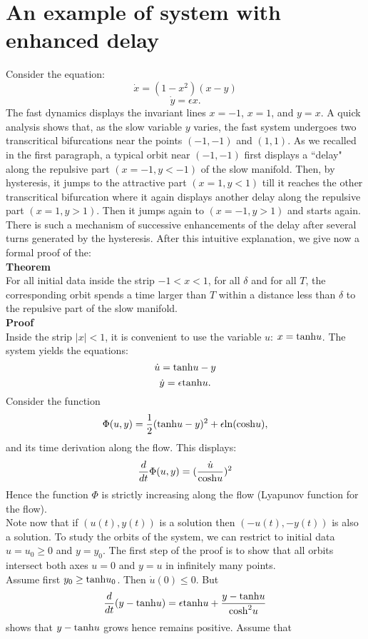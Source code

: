 \documentclass[12pt,psamsfonts]{amsart}
\begin{document}
\section{An example of system with enhanced delay}
Consider the equation:
$$\dot{x}=(1-x^2)(x-y)$$
$$\dot{y}={\epsilon}x.$$
The fast dynamics displays the invariant lines $x=-1$, $x=1$, and
$y=x$. A quick analysis shows that, as the slow variable $y$
varies, the fast system undergoes two transcritical bifurcations
near the points $(-1,-1)$ and $(1,1)$. As we recalled in the first
paragraph, a typical orbit near $(-1,-1)$ first displays a ``delay"
along the repulsive part $(x=-1,y<-1)$ of the slow manifold. Then,
by hysteresis, it jumps to the attractive part $(x=1,y<1)$ till it
reaches the other transcritical bifurcation where it again
displays another delay along the repulsive part $(x=1,y>1)$. Then
it jumps again to $(x=-1, y>1)$ and starts again. There is such a
mechanism of successive enhancements of the delay after several
turns generated by the hysteresis. After this intuitive
explanation, we give now a formal proof of the:\\
{\bf Theorem}\\
For all initial data inside the strip $-1<x<1$, for all $\delta$
and for all $T$, the corresponding orbit spends a time larger than
$T$ within a distance less than $\delta$ to the repulsive part of
the slow manifold.\\
{\bf Proof}\\
Inside the strip $\mid x\mid<1$, it is convenient to use the
variable $u$: $x={\rm tanh}u$. The system yields the equations:
$$\dot{u}={\rm tanh}u-y$$
$$\dot{y}={\epsilon}{\rm tanh}u.$$
Consider the function
$$\Phi(u,y)={\frac{1}{2}}({\rm tanh}u-y)^2+{\epsilon}{\rm ln}({\rm cosh}u),$$
and its time derivation along the flow. This displays:
$$\frac{d}{dt}\Phi(u,y)=(\frac{\dot{u}}{{\rm cosh}u})^2$$
Hence the function $\Phi$ is strictly increasing along the flow
(Lyapunov function for the flow).\\
Note now that if $(u(t),y(t))$ is a solution then $(-u(t),-y(t))$
is also a solution. To study the orbits of the system, we can
restrict to initial data $u=u_0\geq 0$ and $y=y_0$.
The first step of the proof is to show that all orbits intersect both axes $u=0$ and
$y=u$ in infinitely many points.\\
Assume first $y_0\geq {\rm tanh}u_0$. Then ${\dot u}(0)\leq 0$. But
$$\frac{d}{dt}(y-{\rm tanh}u)={\epsilon}{\rm tanh}u+\frac{y-{\rm tanh}u}{{\rm cosh}^2u}$$
shows that $y-{\rm tanh}u$ grows hence remains positive. Assume that
\end{document}

